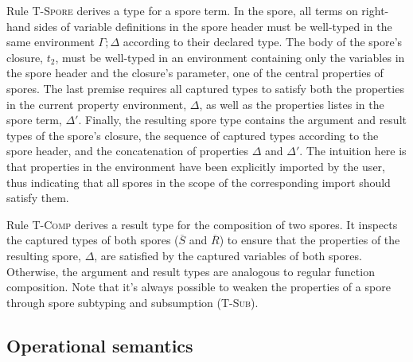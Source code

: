 \documentclass{llncs}
\newcommand{\seq}[1]{\overline{#1}}
\begin{document}
Rule \textsc{T-Spore} derives a type for a spore term. In the spore, all terms on right-hand sides of variable definitions in the spore header must be well-typed in the same environment $\Gamma ; \Delta$ according to their declared type. The body of the spore's closure, $t_2$, must be well-typed in an environment containing only the variables in the spore header and the closure's parameter, one of the central properties of spores. The last premise requires all captured types to satisfy both the properties in the current property environment, $\Delta$, as well as the properties listes in the spore term, $\Delta'$. Finally, the resulting spore type contains the argument and result types of the spore's closure, the sequence of captured types according to the spore header, and the concatenation of properties $\Delta$ and $\Delta'$. The intuition here is that properties in the environment have been explicitly imported by the user, thus indicating that all spores in the scope of the corresponding import should satisfy them.

Rule \textsc{T-Comp} derives a result type for the composition of two spores. It inspects the captured types of both spores ($\seq{S}$ and $\seq{R}$) to ensure that the properties of the resulting spore, $\Delta$, are satisfied by the captured variables of both spores. Otherwise, the argument and result types are analogous to regular function composition. Note that it's always possible to weaken the properties of a spore through spore subtyping and subsumption (\textsc{T-Sub}).

\subsection{Operational semantics}\label{sec:opsem}
\end{document}
